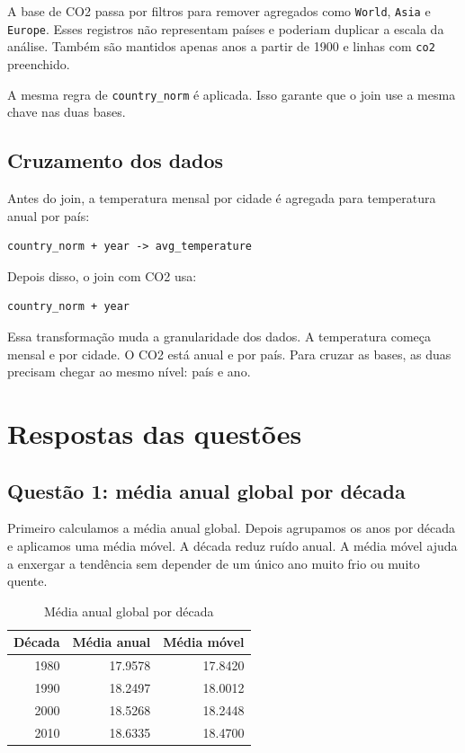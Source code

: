 \documentclass[12pt,a4paper]{article}
\begin{document}
A base de CO2 passa por filtros para remover agregados como \texttt{World}, \texttt{Asia} e \texttt{Europe}. Esses registros não representam países e poderiam duplicar a escala da análise. Também são mantidos apenas anos a partir de 1900 e linhas com \texttt{co2} preenchido.

A mesma regra de \texttt{country\_norm} é aplicada. Isso garante que o join use a mesma chave nas duas bases.

\subsection{Cruzamento dos dados}

Antes do join, a temperatura mensal por cidade é agregada para temperatura anual por país:

\begin{lstlisting}
country_norm + year -> avg_temperature
\end{lstlisting}

Depois disso, o join com CO2 usa:

\begin{lstlisting}
country_norm + year
\end{lstlisting}

Essa transformação muda a granularidade dos dados. A temperatura começa mensal e por cidade. O CO2 está anual e por país. Para cruzar as bases, as duas precisam chegar ao mesmo nível: país e ano.

\section{Respostas das questões}

\subsection{Questão 1: média anual global por década}

Primeiro calculamos a média anual global. Depois agrupamos os anos por década e aplicamos uma média móvel. A década reduz ruído anual. A média móvel ajuda a enxergar a tendência sem depender de um único ano muito frio ou muito quente.

\begin{table}[H]
\centering
\caption{Média anual global por década}
\begin{tabular}{rrr}
\toprule
Década & Média anual & Média móvel \\
\midrule
1980 & 17.9578 & 17.8420 \\
1990 & 18.2497 & 18.0012 \\
2000 & 18.5268 & 18.2448 \\
2010 & 18.6335 & 18.4700 \\
\bottomrule
\end{tabular}
\end{table}
\end{document}
